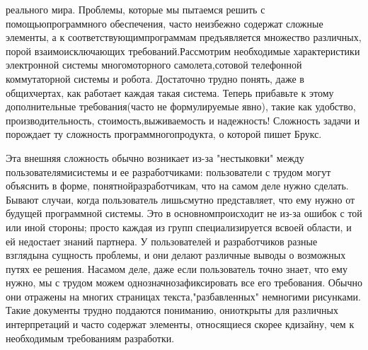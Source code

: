 \documentclass[10pt]{article}
\begin{document}
{ реального мира.} Проблемы, которые мы пытаемся решить с помощью\linebreak  программного обеспечения, часто неизбежно содержат сложные элементы, а к соответствующим\linebreak  программам предъявляется множество различных, порой взаимоисключающих требований.\linebreak  Рассмотрим необходимые характеристики электронной системы многомоторного самолета,\linebreak  сотовой телефонной коммутаторной системы и робота. Достаточно трудно понять, даже в общих\linebreak  чертах, как работает каждая такая система. Теперь прибавьте к этому дополнительные требования\linebreak  (часто не формулируемые явно), такие как удобство, производительность, стоимость,\linebreak  выживаемость и надежность! Сложность задачи и порождает ту сложность программного\linebreak  продукта, о которой пишет Брукс.\vspace{3mm} 

Эта внешняя сложность обычно возникает из-за "нестыковки" между пользователями\linebreak  системы и ее разработчиками: пользователи с трудом могут объяснить в форме, понятной\linebreak  разработчикам, что на самом деле нужно сделать. Бывают случаи, когда пользователь лишь\linebreak  смутно представляет, что ему нужно от будущей программной системы. Это в основном\linebreak  происходит не из-за ошибок с той или иной стороны; просто каждая из групп специализируется в\linebreak  своей области, и ей недостает знаний партнера. У пользователей и разработчиков разные взгляды\linebreak  на сущность проблемы, и они делают различные выводы о возможных путях ее решения. На\linebreak  самом деле, даже если пользователь точно знает, что ему нужно, мы с трудом можем однозначно\linebreak  зафиксировать все его требования. Обычно они отражены на многих страницах текста,\linebreak  "разбавленных" немногими рисунками. Такие документы трудно поддаются пониманию, они\linebreak  открыты для различных интерпретаций и часто содержат элементы, относящиеся скорее к\linebreak  дизайну, чем к необходимым требованиям разработки.\vspace{3mm}
 
\end{document}
